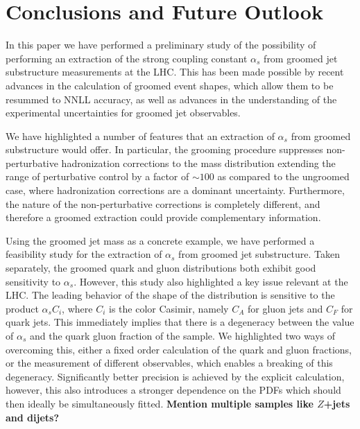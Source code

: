 \documentclass[11pt,letterpaper]{article}
\newcommand{\info}[1]{\textbf{\textcolor{mildred}{(#1)}}}
\begin{document}
%


%


%

\clearpage

\section{Conclusions and Future Outlook}
\label{sec:future}

In this paper we have performed a preliminary study of the possibility of performing an extraction of the strong coupling constant $\alpha_s$ from groomed jet substructure measurements at the LHC.  This has been made possible by recent advances in the calculation of groomed event shapes, which allow them to be resummed to NNLL accuracy, as well as advances in the understanding of the experimental uncertainties for groomed jet observables. 

We have highlighted a number of features that an extraction of $\alpha_s$ from groomed substructure would offer. In particular, the grooming procedure suppresses non-perturbative hadronization corrections to the mass distribution extending the range of perturbative control by a factor of $\sim 100$ as compared to the ungroomed case, where hadronization corrections are a dominant uncertainty. Furthermore, the nature of the non-perturbative corrections is completely different, and therefore a groomed extraction could provide complementary information. 

Using the groomed jet mass as a concrete example, we have performed a feasibility study for the extraction of $\alpha_s$ from groomed jet substructure. Taken separately, the groomed quark and gluon distributions both exhibit good sensitivity to $\alpha_s$. However, this study also highlighted a key issue relevant at the LHC. The leading behavior of the shape of the distribution is sensitive to the product $\alpha_s C_i$, where $C_i$ is the color Casimir, namely $C_A$ for gluon jets and $C_F$ for quark jets. This immediately implies that there is a degeneracy between the value of $\alpha_s$ and the quark gluon fraction of the sample. We highlighted two ways of overcoming this, either a fixed order calculation of the quark and gluon fractions, or the measurement of different observables, which enables a breaking of this degeneracy. Significantly better precision is achieved by the explicit calculation, however, this also introduces a stronger dependence on the PDFs which should then ideally be simultaneously fitted. \textbf{Mention multiple samples like $Z$+jets and dijets?}
\end{document}

